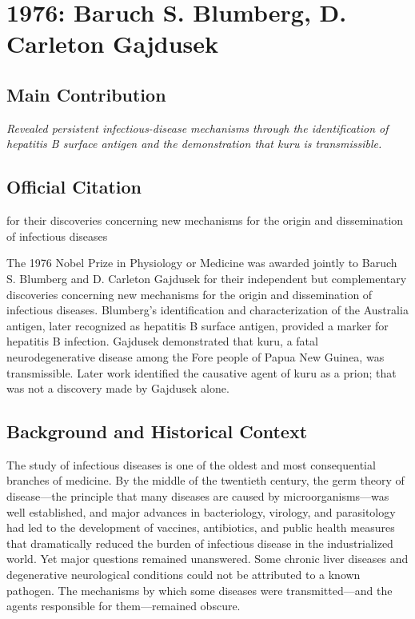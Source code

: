 \chapter[1976 --- Blumberg and Gajdusek]{1976: Baruch S. Blumberg, D. Carleton Gajdusek}
\label{ch:1976_Blumberg}

\section*{Main Contribution}

\textit{Revealed persistent infectious-disease mechanisms through the identification of hepatitis B surface antigen and the demonstration that kuru is transmissible.}\cite{nobel-1976,lecture-1976,lecture-gajdusek-1976}

\section{Official Citation}

for their discoveries concerning new mechanisms for the origin and dissemination of infectious diseases

The 1976 Nobel Prize in Physiology or Medicine was awarded jointly to Baruch S. Blumberg and D. Carleton Gajdusek for their independent but complementary discoveries concerning new mechanisms for the origin and dissemination of infectious diseases. Blumberg's identification and characterization of the Australia antigen, later recognized as hepatitis B surface antigen, provided a marker for hepatitis B infection. Gajdusek demonstrated that kuru, a fatal neurodegenerative disease among the Fore people of Papua New Guinea, was transmissible. Later work identified the causative agent of kuru as a prion; that was not a discovery made by Gajdusek alone.

\section{Background and Historical Context}

The study of infectious diseases is one of the oldest and most consequential branches of medicine. By the middle of the twentieth century, the germ theory of disease---the principle that many diseases are caused by microorganisms---was well established, and major advances in bacteriology, virology, and parasitology had led to the development of vaccines, antibiotics, and public health measures that dramatically reduced the burden of infectious disease in the industrialized world. Yet major questions remained unanswered. Some chronic liver diseases and degenerative neurological conditions could not be attributed to a known pathogen. The mechanisms by which some diseases were transmitted---and the agents responsible for them---remained obscure.

